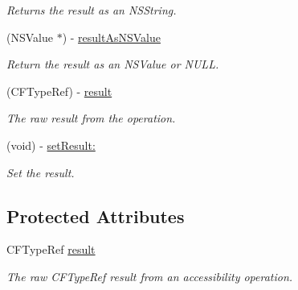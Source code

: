 \begin{DoxyCompactItemize}
\begin{DoxyCompactList}\small\item\em Returns the result as an NSString. \item\end{DoxyCompactList}\item 
\hypertarget{interface_g_d_accessibility_operation_result_aeb5c6909f9fcd18a21805dff64dc9e7f}{
(NSValue $\ast$) -\/ \hyperlink{interface_g_d_accessibility_operation_result_aeb5c6909f9fcd18a21805dff64dc9e7f}{resultAsNSValue}}
\label{interface_g_d_accessibility_operation_result_aeb5c6909f9fcd18a21805dff64dc9e7f}

\begin{DoxyCompactList}\small\item\em Return the result as an NSValue or NULL. \item\end{DoxyCompactList}\item 
\hypertarget{interface_g_d_accessibility_operation_result_aa9268222bbab46c715537293324cfb6f}{
(CFTypeRef) -\/ \hyperlink{interface_g_d_accessibility_operation_result_aa9268222bbab46c715537293324cfb6f}{result}}
\label{interface_g_d_accessibility_operation_result_aa9268222bbab46c715537293324cfb6f}

\begin{DoxyCompactList}\small\item\em The raw result from the operation. \item\end{DoxyCompactList}\item 
(void) -\/ \hyperlink{interface_g_d_accessibility_operation_result_abc0beacffc69b1116f6a332b26b0aeb8}{setResult:}
\begin{DoxyCompactList}\small\item\em Set the result. \item\end{DoxyCompactList}\end{DoxyCompactItemize}
\subsection*{Protected Attributes}
\begin{DoxyCompactItemize}
\item 
\hypertarget{interface_g_d_accessibility_operation_result_af1c57b003612db6ad1ccebd5b956cf3b}{
CFTypeRef \hyperlink{interface_g_d_accessibility_operation_result_af1c57b003612db6ad1ccebd5b956cf3b}{result}}
\label{interface_g_d_accessibility_operation_result_af1c57b003612db6ad1ccebd5b956cf3b}

\begin{DoxyCompactList}\small\item\em The raw CFTypeRef result from an accessibility operation. \item\end{DoxyCompactList}\end{DoxyCompactItemize}
